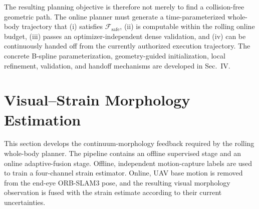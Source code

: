\documentclass[journal,twoside]{IEEEtran}
\begin{document}
The resulting planning objective is therefore not merely to find a collision-free geometric path. The online planner must generate a time-parameterized whole-body trajectory that (i) satisfies $\mathcal F_{\mathrm{safe}}$, (ii) is computable within the rolling online budget, (iii) passes an optimizer-independent dense validation, and (iv) can be continuously handed off from the currently authorized execution trajectory. The concrete B-spline parameterization, geometry-guided initialization, local refinement, validation, and handoff mechanisms are developed in Sec.~IV.


\section{Visual--Strain Morphology Estimation}
This section develops the continuum-morphology feedback required by the rolling whole-body planner. The pipeline contains an offline supervised stage and an online adaptive-fusion stage. Offline, independent motion-capture labels are used to train a four-channel strain estimator. Online, UAV base motion is removed from the end-eye ORB-SLAM3 pose, and the resulting visual morphology observation is fused with the strain estimate according to their current uncertainties.
\end{document}
